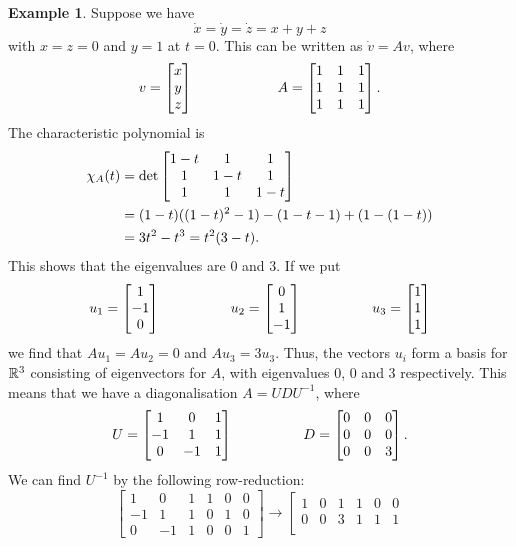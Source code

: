 \documentclass[reqno]{amsart}
\theoremstyle{definition}
\newtheorem{example}[theorem]{Example}
\begin{document}
\begin{example}\label{eg-ode-ii}
 Suppose we have
 \[ \dot{x} = \dot{y} = \dot{z} = x+y+z \]
 with $x=z=0$ and $y=1$ at $t=0$.  This can be written as
 $\dot{v}=Av$, where 
 \[ v = \left[\begin{matrix} x \\ y \\ z \end{matrix}\right] \hspace{6em}
    A = \left[\begin{matrix} 1 & 1 & 1 \\ 1 & 1 & 1 \\ 1 & 1 & 1 \end{matrix}\right].
 \]
 The characteristic polynomial is 
 \begin{align*}
  \chi_A(t) &=
   \det\left[\begin{matrix} 1-t & 1 & 1 \\ 1 & 1-t & 1 \\ 1 & 1 & 1-t \end{matrix}\right] \\
  &= (1-t)((1-t)^2-1) - (1-t-1) + (1-(1-t)) \\
  &= 3t^2 - t^3 = t^2(3-t).
 \end{align*}
 This shows that the eigenvalues are $0$ and $3$.  If we put 
 \[ u_1 = \left[\begin{matrix} 1 \\ -1 \\ 0 \end{matrix}\right] \hspace{5em}
    u_2 = \left[\begin{matrix} 0 \\ 1 \\ -1 \end{matrix}\right] \hspace{5em}
    u_3 = \left[\begin{matrix} 1 \\ 1 \\ 1 \end{matrix}\right]
 \]
 we find that $Au_1=Au_2=0$ and $Au_3=3u_3$.  Thus, the vectors $u_i$
 form a basis for ${\mathbb{R}}^3$ consisting of eigenvectors for $A$, with
 eigenvalues $0$, $0$ and $3$ respectively.  This means that we have a
 diagonalisation $A=UDU^{-1}$, where  
 \[ U = \left[\begin{matrix} 1 & 0 & 1 \\ -1 & 1 & 1 \\ 0 & -1 & 1 \end{matrix}\right]
    \hspace{5em}
    D = \left[\begin{matrix} 0 & 0 & 0 \\ 0 & 0 & 0 \\ 0 & 0 & 3 \end{matrix}\right].
 \] 
 We can find $U^{-1}$ by the following row-reduction:
 \[ 
  \left[\begin{array}{ccc|ccc}
    1 &  0 &  1 &  1 &  0 &  0 \\
   -1 &  1 &  1 &  0 &  1 &  0 \\
    0 & -1 &  1 &  0 &  0 &  1 
  \end{array}\right] \to 
  \left[\begin{array}{ccc|ccc}
    1 &  0 &  1 &  1 &  0 &  0 \\
    0 &  0 &  3 &  1 &  1 &  1 \\

\end{array}\]
\end{example}
\end{document}
